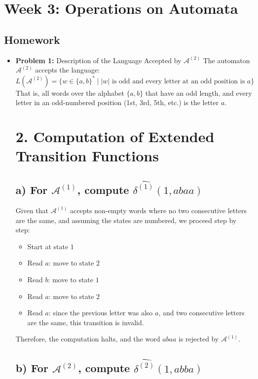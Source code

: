 \documentclass[11pt]{article}
\begin{document}
\section{Week 3: Operations on Automata}
\subsection{Homework}
\begin{itemize}[leftmargin=*]
\item \textbf{Problem 1:} Description of the Language Accepted by $\mathcal{A}^{(2)}$
The automaton $\mathcal{A}^{(2)}$ accepts the language:
\[
L(\mathcal{A}^{(2)}) = \{ w \in \{a,b\}^* \mid |w| \text{ is odd and every letter at an odd position is } a \}
\]
That is, all words over the alphabet $\{a,b\}$ that have an odd length, and every letter in an odd-numbered position (1st, 3rd, 5th, etc.) is the letter $a$.

\section*{2. Computation of Extended Transition Functions}

\subsection*{a) For $\mathcal{A}^{(1)}$, compute $\widehat{\delta^{(1)}}(1, abaa)$}

Given that $\mathcal{A}^{(1)}$ accepts non-empty words where no two consecutive letters are the same, and assuming the states are numbered, we proceed step by step:

\begin{itemize}
    \item Start at state $1$
    \item Read $a$: move to state $2$
    \item Read $b$: move to state $1$
    \item Read $a$: move to state $2$
    \item Read $a$: since the previous letter was also $a$, and two consecutive letters are the same, this transition is invalid.
\end{itemize}

Therefore, the computation halts, and the word $abaa$ is rejected by $\mathcal{A}^{(1)}$.

\subsection*{b) For $\mathcal{A}^{(2)}$, compute $\widehat{\delta^{(2)}}(1, abba)$}


\end{itemize}
\end{document}
